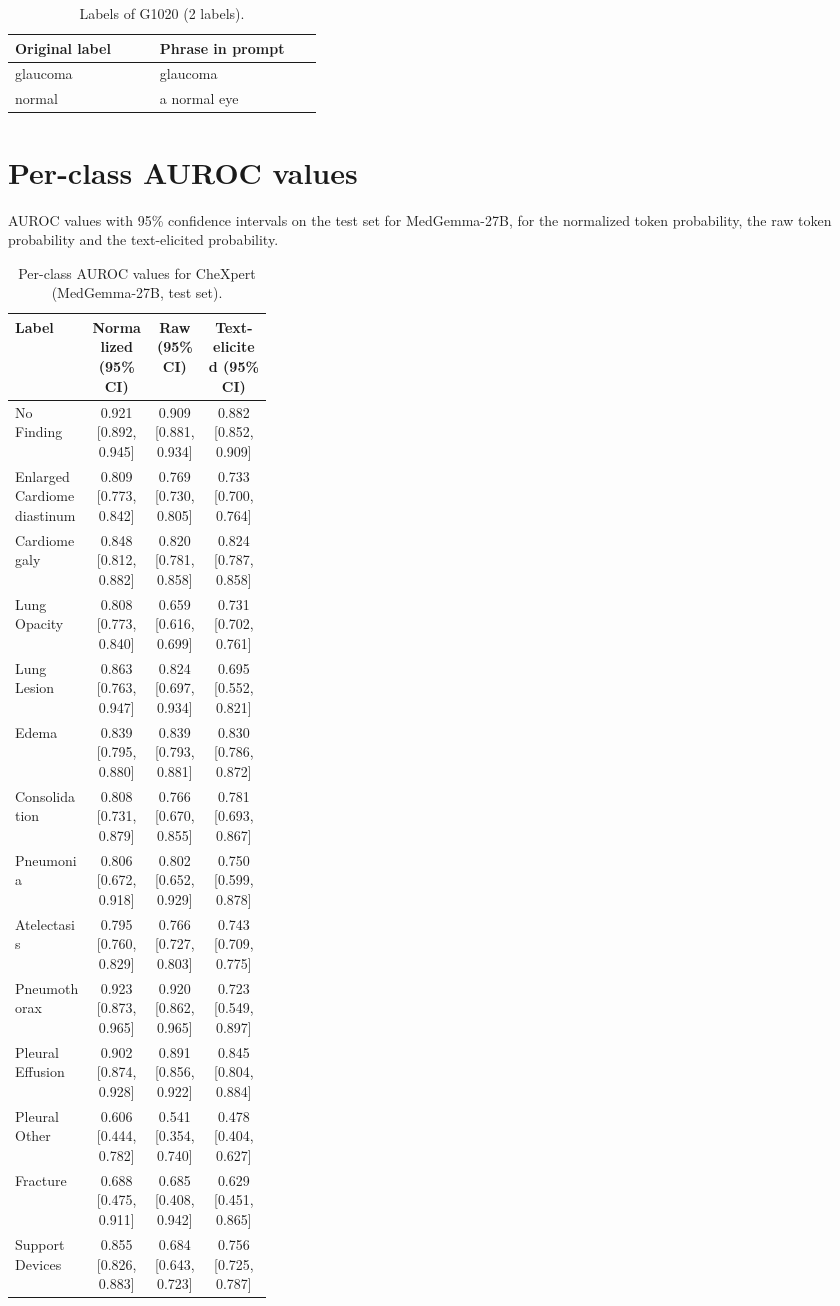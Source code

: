 \begin{table}[htbp]
\centering
\small
\caption{Labels of G1020 (2 labels).}\label{tab:labels_G1020}
\begin{tabular}{p{0.4\linewidth}p{0.45\linewidth}}
\toprule
Original label & Phrase in prompt \\
\midrule
glaucoma & glaucoma \\
normal & a normal eye \\
\bottomrule
\end{tabular}
\end{table}

\clearpage
\section{Per-class AUROC values}\label{sec:perclass}
AUROC values with 95\% confidence intervals on the test set for MedGemma-27B, for the normalized token probability, the raw token probability and the text-elicited probability.

\begin{table}[htbp]
\centering
\footnotesize
\setlength{\tabcolsep}{4pt}
\caption{Per-class AUROC values for CheXpert (MedGemma-27B, test set).}\label{tab:auroc_CheXpert}
\begin{tabular}{p{0.3\linewidth}ccc}
\toprule
Label & Normalized (95\% CI) & Raw (95\% CI) & Text-elicited (95\% CI) \\
\midrule
No Finding & 0.921 [0.892, 0.945] & 0.909 [0.881, 0.934] & 0.882 [0.852, 0.909] \\
Enlarged Cardiomediastinum & 0.809 [0.773, 0.842] & 0.769 [0.730, 0.805] & 0.733 [0.700, 0.764] \\
Cardiomegaly & 0.848 [0.812, 0.882] & 0.820 [0.781, 0.858] & 0.824 [0.787, 0.858] \\
Lung Opacity & 0.808 [0.773, 0.840] & 0.659 [0.616, 0.699] & 0.731 [0.702, 0.761] \\
Lung Lesion & 0.863 [0.763, 0.947] & 0.824 [0.697, 0.934] & 0.695 [0.552, 0.821] \\
Edema & 0.839 [0.795, 0.880] & 0.839 [0.793, 0.881] & 0.830 [0.786, 0.872] \\
Consolidation & 0.808 [0.731, 0.879] & 0.766 [0.670, 0.855] & 0.781 [0.693, 0.867] \\
Pneumonia & 0.806 [0.672, 0.918] & 0.802 [0.652, 0.929] & 0.750 [0.599, 0.878] \\
Atelectasis & 0.795 [0.760, 0.829] & 0.766 [0.727, 0.803] & 0.743 [0.709, 0.775] \\
Pneumothorax & 0.923 [0.873, 0.965] & 0.920 [0.862, 0.965] & 0.723 [0.549, 0.897] \\
Pleural Effusion & 0.902 [0.874, 0.928] & 0.891 [0.856, 0.922] & 0.845 [0.804, 0.884] \\
Pleural Other & 0.606 [0.444, 0.782] & 0.541 [0.354, 0.740] & 0.478 [0.404, 0.627] \\
Fracture & 0.688 [0.475, 0.911] & 0.685 [0.408, 0.942] & 0.629 [0.451, 0.865] \\
Support Devices & 0.855 [0.826, 0.883] & 0.684 [0.643, 0.723] & 0.756 [0.725, 0.787] \\
\bottomrule
\end{tabular}
\end{table}


